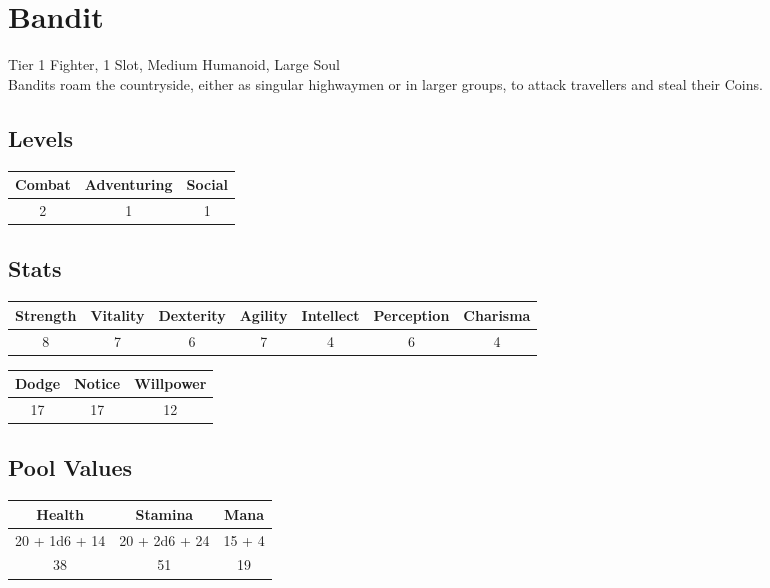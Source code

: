 \section{Bandit}\label{creature:bandit}
Tier 1 Fighter, 1 Slot, Medium Humanoid, Large Soul\\
Bandits roam the countryside, either as singular highwaymen or in larger groups, to attack travellers and steal their Coins.

\subsection{Levels}
\begin{minipage}[H]{1\textwidth}
	\centering
	\begin{tabular}[c]{|c | c | c|}
		\hline
		Combat & Adventuring & Social\\
		\hline
		2 & 1 & 1\\
		\hline
	\end{tabular}
\end{minipage}

\subsection{Stats}
\begin{minipage}[H]{1\textwidth}
	\centering
	\begin{tabular}[c]{|c | c | c | c | c | c | c|}
		\hline
		Strength & Vitality & Dexterity & Agility & Intellect & Perception & Charisma\\
		\hline
		8 & 7 & 6 & 7 & 4 & 6 & 4\\
		\hline
	\end{tabular}
\end{minipage}

\begin{minipage}[H]{1\textwidth}
	\centering
	\begin{tabular}[c]{|c | c | c|}
		\hline
		Dodge & Notice & Willpower\\
		\hline
		17 & 17 & 12\\
		\hline
	\end{tabular}
\end{minipage}

\subsection{Pool Values}
\begin{minipage}[H]{1\textwidth}
	\centering
	\begin{tabular}[c]{|c | c | c|}
		\hline
		Health & Stamina & Mana\\
		\hline
		20 + 1d6 + 14 & 20 + 2d6 + 24 & 15 + 4 \\
		38 & 51 & 19\\
		\hline
	\end{tabular}
\end{minipage}

